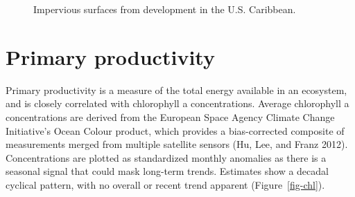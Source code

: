 \documentclass[
  letterpaper,
  oneside,
  open=any]{scrbook}
\begin{document}
\begin{figure}


\caption{\label{fig-landuse}Impervious surfaces from development in the
U.S. Caribbean.}

\end{figure}%

\section{Primary productivity}\label{primary-productivity}

Primary productivity is a measure of the total energy available in an
ecosystem, and is closely correlated with chlorophyll a concentrations.
Average chlorophyll a concentrations are derived from the European Space
Agency Climate Change Initiative's Ocean Colour product, which provides
a bias-corrected composite of measurements merged from multiple
satellite sensors (Hu, Lee, and Franz 2012). Concentrations are plotted
as standardized monthly anomalies as there is a seasonal signal that
could mask long-term trends. Estimates show a decadal cyclical pattern,
with no overall or recent trend apparent (Figure~\ref{fig-chl}).
\end{document}
